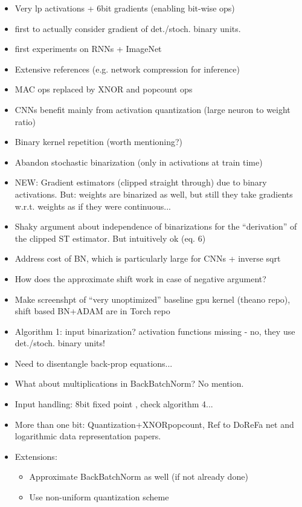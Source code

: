 \documentclass{article}
\begin{document}
    \begin{itemize}
        \item Very lp activations + 6bit gradients (enabling bit-wise ops)
        \item first to actually consider gradient of det./stoch. binary units.
        \item first experiments on RNNs + ImageNet
        \item Extensive references (e.g. network compression for inference)
        \item MAC ops replaced by XNOR and popcount ops
        \item CNNs benefit mainly from activation quantization (large neuron to
        weight ratio)
        \item Binary kernel repetition (worth mentioning?)
        \item Abandon stochastic binarization (only in activations at train time)
        \item NEW: Gradient estimators (clipped straight through) due to binary
        activations. But: weights are binarized as well, but still they take
        gradients w.r.t. weights as if they were continuous...
        \item Shaky argument about independence of binarizations for the
        ``derivation'' of the clipped ST estimator. But intuitively ok (eq. 6)
        \item Address cost of BN, which is particularly large for CNNs + inverse sqrt
        \item How does the approximate shift work in case of negative argument?
        \item Make screenshpt of ``very unoptimized'' baseline gpu kernel (theano repo),
        shift based BN+ADAM are in Torch repo
        \item Algorithm 1: input binarization? activation functions missing - no,
        they use det./stoch. binary units!
        \item Need to disentangle back-prop equations...
        \item What about multiplications in BackBatchNorm? No mention.
        \item Input handling: 8bit fixed point , check algorithm 4...
        \item More than one bit: Quantization+XNORpopcount, Ref to DoReFa net and
        logarithmic data representation papers.
        \item Extensions:
        \begin{itemize}
            \item Approximate BackBatchNorm as well (if not already done)
            \item Use non-uniform quantization scheme
        \end{itemize}
    \end{itemize}
\end{document}
